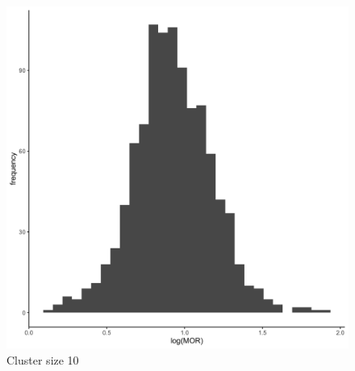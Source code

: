 \documentclass[
  letterpaper,
  DIV=11,
  numbers=noendperiod,
  titlepage]{scrartcl}
\begin{document}
\begin{figure}
\begin{minipage}[t]{0.24\linewidth}
{{\includegraphics{../../plots/two-lvl-ran-slope/high-prev/hist_50_10_two_lvl_slp_high_prev_q2.png}

}

\caption{Cluster size 10}

}

\end{minipage}%
%
\begin{minipage}[t]{0.24\linewidth}

{\centering 

}
\end{minipage}
\end{figure}
\end{document}
